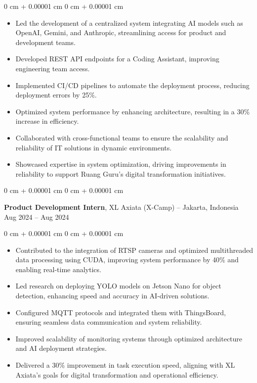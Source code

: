 \documentclass[10pt, a4paper]{article}
\newenvironment{highlights}{
    \begin{itemize}[
        topsep=0.10 cm,
        parsep=0.10 cm,
        partopsep=0pt,
        itemsep=0pt,
        leftmargin=0 cm + 10pt
    ]
}{
    \end{itemize}
} %
\newenvironment{onecolentry}{
    \begin{adjustwidth}{
        0 cm + 0.00001 cm
    }{
        0 cm + 0.00001 cm
    }
}{
    \end{adjustwidth}
} %
\newenvironment{twocolentry}[2][]{
    \onecolentry
    \def\secondColumn{#2}
    \setcolumnwidth{\fill, 4.5 cm}
    \begin{paracol}{2}
}{
    \switchcolumn \raggedleft \secondColumn
    \end{paracol}
    \endonecolentry
} %
\begin{document}
        \vspace{0.10 cm}
        \begin{onecolentry}
            \begin{highlights}
                \item Led the development of a centralized system integrating AI models such as OpenAI, Gemini, and Anthropic, streamlining access for product and development teams.
                \item Developed REST API endpoints for a Coding Assistant, improving engineering team access.
                \item Implemented CI/CD pipelines to automate the deployment process, reducing deployment errors by 25\%.
                \item Optimized system performance by enhancing architecture, resulting in a 30\% increase in efficiency.
                \item Collaborated with cross-functional teams to ensure the scalability and reliability of IT solutions in dynamic environments.
                \item Showcased expertise in system optimization, driving improvements in reliability to support Ruang Guru's digital transformation initiatives.
            \end{highlights}
        \end{onecolentry}


        \vspace{0.2 cm}

        \begin{twocolentry}{
            Aug 2024 – Aug 2024
        }
            \textbf{Product Development Intern}, XL Axiata (X-Camp) -- Jakarta, Indonesia\end{twocolentry}

        \vspace{0.10 cm}
        \begin{onecolentry}
            \begin{highlights}
                \item Contributed to the integration of RTSP cameras and optimized multithreaded data processing using CUDA, improving system performance by 40\% and enabling real-time analytics.
                \item Led research on deploying YOLO models on Jetson Nano for object detection, enhancing speed and accuracy in AI-driven solutions.
                \item Configured MQTT protocols and integrated them with ThingsBoard, ensuring seamless data communication and system reliability.
                \item Improved scalability of monitoring systems through optimized architecture and AI deployment strategies.
                \item Delivered a 30\% improvement in task execution speed, aligning with XL Axiata's goals for digital transformation and operational efficiency.
            \end{highlights}
        \end{onecolentry}
\end{document}
